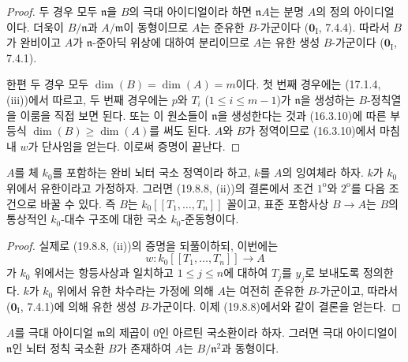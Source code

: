 \begin{proof}
두 경우 모두 $\mathfrak n$을 $B$의 극대 아이디얼이라 하면
$\mathfrak nA$는 분명 $A$의 정의 아이디얼이다. 더욱이
$B/\mathfrak n$과 $A/\mathfrak m$이 동형이므로 $A$는 준유한
$B$-가군이다 ($\mathbf 0_{\mathrm I}$, 7.4.4). 따라서 $B$가 완비이고
$A$가 $\mathfrak n$-준아딕 위상에 대하여 분리이므로 $A$는 유한 생성
$B$-가군이다 ($\mathbf 0_{\mathrm I}$, 7.4.1).


한편 두 경우 모두 $\dim(B)=\dim(A)=m$이다. 첫 번째 경우에는
(17.1.4, (iii))에서 따르고, 두 번째 경우에는 $p$와 $T_i$
($1\leq i\leq m-1$)가 $\mathfrak n$을 생성하는 $B$-정칙열을 이룸을
직접 보면 된다. 또는 이 원소들이 $\mathfrak n$을 생성한다는 것과
(16.3.10)에 따른 부등식 $\dim(B)\geq\dim(A)$를 써도 된다. $A$와
$B$가 정역이므로 (16.3.10)에서 마침내 $w$가 단사임을 얻는다. 이로써
증명이 끝난다.
\end{proof}

\begin{corollary}[19.8.9]
\label{0.19.8.9-ko}
$A$를 체 $k_0$를 포함하는 완비 뇌터 국소 정역이라 하고, $k$를 $A$의
잉여체라 하자. $k$가 $k_0$ 위에서 유한이라고 가정하자. 그러면
(19.8.8, (ii))의 결론에서 조건 $1^{\mathrm o}$와 $2^{\mathrm o}$를
다음 조건으로 바꿀 수 있다. 즉 $B$는 $k_0[[T_1,\ldots,T_n]]$ 꼴이고,
표준 포함사상 $B\to A$는 $B$의 통상적인 $k_0$-대수 구조에 대한 국소
$k_0$-준동형이다.
\end{corollary}

\begin{proof}
실제로 (19.8.8, (ii))의 증명을 되풀이하되, 이번에는
\[
  w:k_0[[T_1,\ldots,T_n]]\longrightarrow A
\]
가 $k_0$ 위에서는 항등사상과 일치하고 $1\leq j\leq n$에 대하여
$T_j$를 $y_j$로 보내도록 정의한다. $k$가 $k_0$ 위에서 유한 차수라는
가정에 의해 $A$는 여전히 준유한 $B$-가군이고, 따라서
($\mathbf 0_{\mathrm I}$, 7.4.1)에 의해 유한 생성 $B$-가군이다.
이제 (19.8.8)에서와 같이 결론을 얻는다.
\end{proof}

\begin{corollary}[19.8.10]
\label{0.19.8.10-ko}
$A$를 극대 아이디얼 $\mathfrak m$의 제곱이 $0$인 아르틴 국소환이라
하자. 그러면 극대 아이디얼이 $\mathfrak n$인 뇌터 정칙 국소환 $B$가
존재하여 $A$는 $B/\mathfrak n^2$과 동형이다.
\end{corollary}

